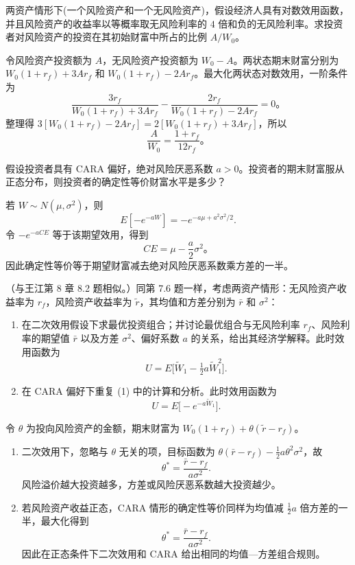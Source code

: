 \begin{problem}
 两资产情形下(一个风险资产和一个无风险资产)，假设经济人具有对数效用函数，并且风险资产的收益率以等概率取无风险利率的 $4$ 倍和负的无风险利率。求投资者对风险资产的投资在其初始财富中所占的比例 $A/W_0$。
\end{problem}
\begin{solution}
令风险资产投资额为 $A$，无风险资产投资额为 $W_0-A$。两状态期末财富分别为 $W_0(1+r_f)+3Ar_f$ 和 $W_0(1+r_f)-2Ar_f$。最大化两状态对数效用，一阶条件为
\[
\frac{3r_f}{W_0(1+r_f)+3Ar_f}-\frac{2r_f}{W_0(1+r_f)-2Ar_f}=0。
\]
整理得 $3[W_0(1+r_f)-2Ar_f]=2[W_0(1+r_f)+3Ar_f]$，所以
\[
\frac{A}{W_0}=\frac{1+r_f}{12r_f}。
\]
\end{solution}
\begin{problem}
 假设投资者具有 CARA 偏好，绝对风险厌恶系数 $a>0$。投资者的期末财富服从正态分布，则投资者的确定性等价财富水平是多少？
\end{problem}
\begin{solution}
若 $W\sim N(\mu,\sigma^2)$，则
\[
E[-e^{-aW}]=-e^{-a\mu+a^2\sigma^2/2}.
\]
令 $-e^{-aCE}$ 等于该期望效用，得到
\[
CE=\mu-\frac a2\sigma^2。
\]
因此确定性等价等于期望财富减去绝对风险厌恶系数乘方差的一半。
\end{solution}
\begin{problem}
（与王江第 8 章 8.2 题相似。）同第 7.6 题一样，考虑两资产情形：无风险资产收益率为 $r_f$，风险资产收益率为 $\tilde{r}$，其均值和方差分别为 $\bar{r}$ 和 $\sigma^2$：
\begin{enumerate}[label=(\alph*)]
    \item 在二次效用假设下求最优投资组合；并讨论最优组合与无风险利率 $r_f$、风险利率的期望值 $\bar{r}$ 以及方差 $\sigma^2$、偏好系数 $a$ 的关系，给出其经济学解释。此时效用函数为
    \[
        U=E\bigl[\tilde{W}_1-\tfrac12 a\tilde{W}_1^2\bigr].
    \]
    \item 在 CARA 偏好下重复 (1) 中的计算和分析。此时效用函数为
    \[
        U=E\bigl[-e^{-a\tilde{W}_1}\bigr].
    \]
\end{enumerate}
\end{problem}
\begin{solution}
令 $\theta$ 为投向风险资产的金额，期末财富为 $W_0(1+r_f)+\theta(\tilde r-r_f)$。
\begin{enumerate}[label=(\alph*)]
\item 二次效用下，忽略与 $\theta$ 无关的项，目标函数为 $\theta(\bar r-r_f)-\frac12 a\theta^2\sigma^2$，故
\[
\theta^*=\frac{\bar r-r_f}{a\sigma^2}.
\]
风险溢价越大投资越多，方差或风险厌恶系数越大投资越少。
\item 若风险资产收益正态，CARA 情形的确定性等价同样为均值减 $\frac12 a$ 倍方差的一半，最大化得到
\[
\theta^*=\frac{\bar r-r_f}{a\sigma^2}.
\]
因此在正态条件下二次效用和 CARA 给出相同的均值—方差组合规则。
\end{enumerate}
\end{solution}
